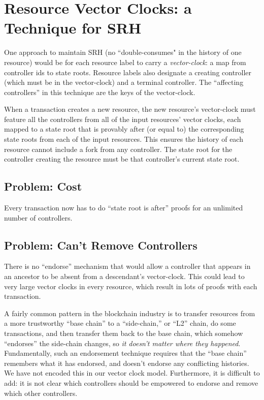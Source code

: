 \documentclass[a4paper,USenglish,cleveref, autoref, thm-restate, anonymous]{lipics-v2021}
\begin{document}


\appendix


\section{Resource Vector Clocks: a Technique for SRH}
\label{sec:resourcevectorclocks}
One approach to maintain SRH (no ``double-consumes" in the history of one resource) would be for each resource label to carry a \textit{vector-clock}: a map from controller ids to state roots. 
Resource labels also designate a creating controller (which must be in the vector-clock) and a terminal controller.
The ``affecting controllers'' in this technique are the keys of the vector-clock.

When a transaction creates a new resource, the new resource's vector-clock must feature all the controllers from all of the input resources' vector clocks, each mapped to a state root that is provably after (or equal to) the corresponding state roots from each of the input resources. 
This ensures the history of each resource cannot include a fork from any controller. 
The state root for the controller creating the resource must be that controller's current state root. 

\subsection{Problem: Cost}
Every transaction now has to do ``state root is after'' proofs for an unlimited number of controllers.

\subsection{Problem: Can't Remove Controllers}
There is no ``endorse'' mechanism that would allow a controller that appears in an ancestor to be absent from a descendant's vector-clock. 
This could lead to very large vector clocks in every resource, which result in lots of proofs with each transaction.

A fairly common pattern in the blockchain industry is to transfer resources from a more trustworthy ``base chain'' to a ``side-chain,'' or ``L2'' chain, do some transactions, and then transfer them back to the base chain, which somehow ``endorses'' the side-chain changes, so \textit{it doesn't matter where they happened}. 
Fundamentally, such an endorsement technique requires that the ``base chain'' remembers what it has endorsed, and doesn't endorse any conflicting histories. 
We have not encoded this in our vector clock model.
Furthermore, it is difficult to add: it is not clear which controllers should be empowered to endorse and remove which other controllers. 
\end{document}
